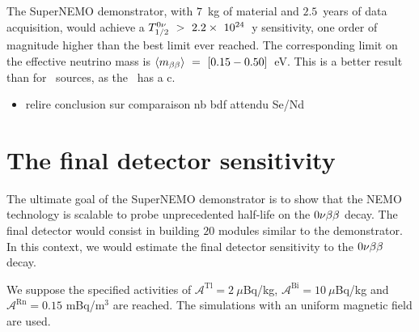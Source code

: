 The SuperNEMO demonstrator, with $7$~kg of material and $2.5$~years of data acquisition, would achieve a $T_{1/2}^{0\nu}~>~2.2\times~10^{24}$~y sensitivity, one order of magnitude higher than the best limit ever reached.
The corresponding limit on the effective neutrino mass is $\langle m_{\beta\beta}\rangle~=~[0.15-0.50]$~eV.
This is a better result than for \Se\ sources, as the \Nd\ has a c.

\begin{itemize}
\item relire conclusion sur comparaison nb bdf attendu Se/Nd
\end{itemize}


\section{The final detector sensitivity}

The ultimate goal of the SuperNEMO demonstrator is to show that the NEMO technology is scalable to probe unprecedented half-life on the $0\nu\beta\beta$ decay.
The final detector would consist in building $20$ modules similar to the demonstrator.
In this context, we would estimate the final detector sensitivity to the $0\nu\beta\beta$ decay.

We suppose the specified activities of $\mathcal{A}^{\text{Tl}} = 2~\mu$Bq/kg, $\mathcal{A}^{\text{Bi}} = 10~\mu$Bq/kg and $\mathcal{A}^{\text{Rn}} = 0.15$ mBq/m$^{3}$ are reached.
The simulations with an uniform magnetic field are used.

